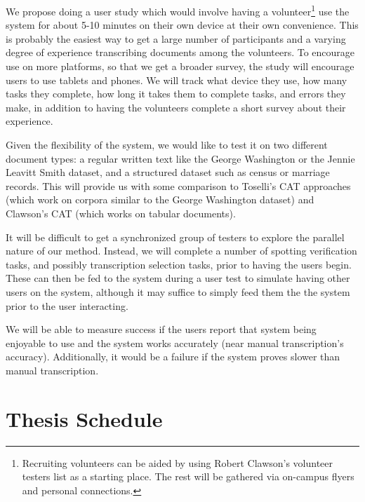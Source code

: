 \documentclass[ms]{byuprop}
\begin{document}
We propose doing a user study which would involve having a volunteer\footnote{Recruiting volunteers can be aided by using Robert Clawson's volunteer testers list as a starting place. The rest will be gathered via on-campus flyers and personal connections.} use the system for about 5-10 minutes on their own device at their own convenience. This is probably the easiest way to get a large number of participants and a varying degree of experience transcribing documents among the volunteers. To encourage use on more platforms, so that we get a broader survey, the study will encourage users to use tablets and phones.
We will track what device they use, how many tasks they complete, how long it takes them to complete tasks, and errors they make, in addition to having the volunteers complete a short survey about their experience.

Given the flexibility of the system, we would like to test it on two different document types: a regular written text like the George Washington\cite{GW} or the Jennie Leavitt Smith\cite{Smith} dataset, and a structured dataset such as census or marriage records. This will provide us with some comparison to Toselli's CAT approaches (which work on corpora similar to the George Washington dataset) and Clawson's CAT (which works on tabular documents).

It will be difficult to get a synchronized group of testers to explore the parallel nature of our method. Instead, we will complete a number of spotting verification tasks, and possibly transcription selection tasks, prior to having the users begin. These can then be fed to the system during a user test to simulate having other users on the system, although it may suffice to simply feed them the the system prior to the user interacting.

We will be able to measure success if the users report that system being enjoyable to use and the system works accurately (near manual transcription's accuracy). Additionally, it would be a failure if the system proves slower than manual transcription.


\section{Thesis Schedule}
\end{document}
